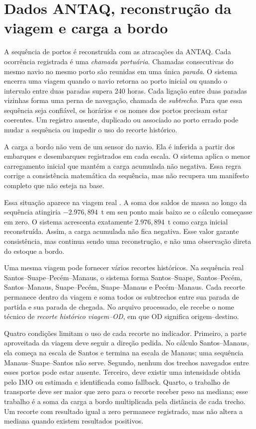 \section{Dados ANTAQ, reconstrução da viagem e carga a bordo}
\label{sec:limitacao-dados-maritimos}

A sequência de portos é reconstruída com as atracações da ANTAQ. Cada ocorrência registrada é uma \emph{chamada portuária}. Chamadas consecutivas do mesmo navio no mesmo porto são reunidas em uma única \emph{parada}. O sistema encerra uma viagem quando o navio retorna ao porto inicial ou quando o intervalo entre duas paradas supera 240 horas. Cada ligação entre duas paradas vizinhas forma uma perna de navegação, chamada de \emph{subtrecho}. Para que essa sequência seja confiável, os horários e os nomes dos portos precisam estar coerentes. Um registro ausente, duplicado ou associado ao porto errado pode mudar a sequência ou impedir o uso do recorte histórico.

A carga a bordo não vem de um sensor do navio. Ela é inferida a partir dos embarques e desembarques registrados em cada escala. O sistema aplica o menor carregamento inicial que mantém a carga acumulada não negativa. Essa regra corrige a consistência matemática da sequência, mas não recupera um manifesto completo que não esteja na base.

Essa situação aparece na viagem real . A soma dos saldos de massa ao longo da sequência atingiria \(-2.976{,}894\)~t em seu ponto mais baixo se o cálculo começasse em zero. O sistema acrescenta exatamente \(2.976{,}894\)~t como carga inicial reconstruída. Assim, a carga acumulada não fica negativa. Esse valor garante consistência, mas continua sendo uma reconstrução, e não uma observação direta do estoque a bordo.

Uma mesma viagem pode fornecer vários recortes históricos. Na sequência real Santos--Suape--Pecém--Manaus, o sistema forma Santos--Suape, Santos--Pecém, Santos--Manaus, Suape--Pecém, Suape--Manaus e Pecém--Manaus. Cada recorte permanece dentro da viagem  e soma todos os subtrechos entre sua parada de partida e sua parada de chegada. No arquivo processado, ele recebe o nome técnico de \emph{recorte histórico viagem--OD}, em que OD significa origem--destino.

Quatro condições limitam o uso de cada recorte no indicador. Primeiro, a parte aproveitada da viagem deve seguir a direção pedida. No cálculo Santos--Manaus, ela começa na escala de Santos e termina na escala de Manaus; uma sequência Manaus--Suape--Santos não serve. Segundo, nenhum dos trechos navegados entre esses portos pode estar ausente. Terceiro, deve existir uma intensidade obtida pelo IMO ou estimada e identificada como fallback. Quarto, o trabalho de transporte deve ser maior que zero para o recorte receber peso na mediana; esse trabalho é a soma da carga a bordo multiplicada pela distância de cada trecho. Um recorte com resultado igual a zero permanece registrado, mas não altera a mediana quando existem resultados positivos.

